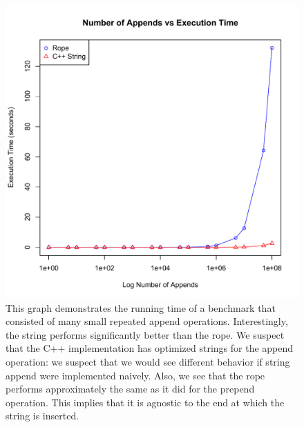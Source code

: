 \documentclass[12pt]{article}
\begin{document}
\begin{figure}[p]
\begin{centering}
\includegraphics[scale=1.0]{append_vs_execution}
\caption{This graph demonstrates the running time of a benchmark that consisted of many small repeated append operations. Interestingly, the string performs significantly better than the rope. We suspect that the C++ implementation has optimized strings for the append operation: we suspect that we would see different behavior if string append were implemented naively. Also, we see that the rope performs approximately the same as it did for the prepend operation. This implies that it is agnostic to the end at which the string is inserted.}

\end{centering}
\end{figure}
\end{document}

